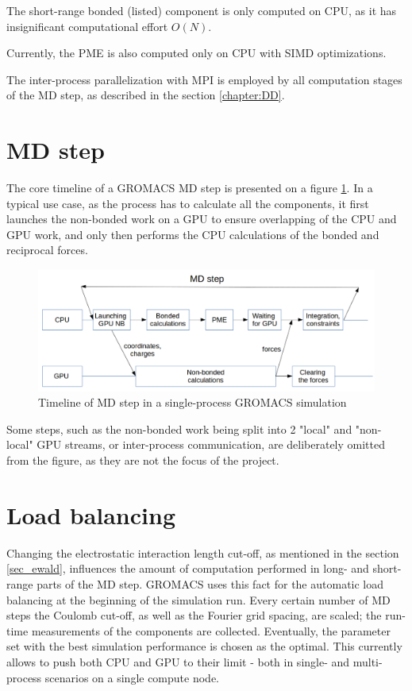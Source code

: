 \documentclass[12pt,a4paper]{report}
\newcommand{\draft}[1]{#1}
\begin{document}
The short-range bonded (listed) component is only computed on CPU, as it has insignificant computational effort $O(N)$.

Currently, the PME is also computed only on CPU with SIMD optimizations. 

The inter-process parallelization with MPI is employed by all computation stages of the MD step, as described in the section \ref{chapter:DD}.

\section{MD step}
\FloatBarrier
The core timeline of a GROMACS MD step is presented on a figure \ref{fig:step-orig}. In a typical use case, as the process has to calculate all the components, it first launches the non-bonded work on a GPU to ensure overlapping of the CPU and GPU work, and only then performs the CPU calculations of the bonded and reciprocal forces. 
\begin{figure}
    \centering
    \includegraphics[width=1\textwidth]{pics/mdstep-orig.png}
    \caption{Timeline of MD step in a single-process GROMACS simulation}
    \label{fig:step-orig}
\end{figure}
\FloatBarrier

Some steps, such as  the non-bonded work being split into 2 "local" and "non-local" GPU streams, or inter-process communication, are deliberately omitted from the figure, as they are not the focus of the project. 


\section{Load balancing} \label{PMEtuning}
Changing the electrostatic interaction length cut-off, as mentioned in the section \ref{sec_ewald}, influences the amount of computation performed in long- and short-range parts of the MD step. GROMACS uses this fact for the automatic load balancing at the beginning of the simulation run. Every certain number of MD steps the Coulomb cut-off, as well as the Fourier grid spacing, are scaled; the run-time measurements of the components are collected. Eventually, the parameter set with the best simulation performance is chosen as the optimal. This currently allows to push both CPU and GPU to their limit - both in single- and multi-process scenarios on a single compute node.
\end{document}
